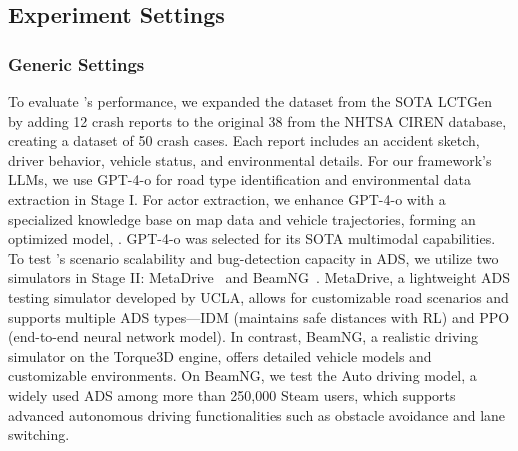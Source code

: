\subsection{Experiment Settings}
\subsubsection{Generic Settings}
To evaluate {\tool}'s performance, we expanded the dataset from the SOTA LCTGen~\cite{tan2023language} by adding 12 crash reports to the original 38 from the NHTSA CIREN database, creating a dataset of 50 crash cases. Each report includes an accident sketch, driver behavior, vehicle status, and environmental details. For our framework’s LLMs, we use GPT-4-o for road type identification and environmental data extraction in Stage I. For actor extraction, we enhance GPT-4-o with a specialized knowledge base on map data and vehicle trajectories, forming an optimized model, {\tooltwo}. GPT-4-o was selected for its SOTA multimodal capabilities. To test {\tool}’s scenario scalability and bug-detection capacity in ADS, we utilize two simulators in Stage II: MetaDrive~\cite{li2022metadrive} and BeamNG~\cite{BeamNG}. MetaDrive, a lightweight ADS testing simulator developed by UCLA, allows for customizable road scenarios and supports multiple ADS types—IDM (maintains safe distances with RL) and PPO (end-to-end neural network model). In contrast, BeamNG, a realistic driving simulator on the Torque3D engine, offers detailed vehicle models and customizable environments. On BeamNG, we test the Auto driving model, a widely used ADS among more than 250,000 Steam users, which supports advanced autonomous driving functionalities such as obstacle avoidance and lane switching.

